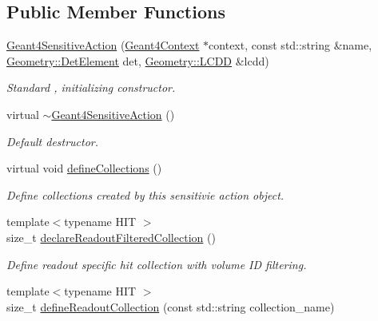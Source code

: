 \subsection*{Public Member Functions}
\begin{DoxyCompactItemize}
\item 
\hyperlink{class_d_d4hep_1_1_simulation_1_1_geant4_sensitive_action_ae1ede070242c666b523a1bb28a19a8f5}{Geant4SensitiveAction} (\hyperlink{class_d_d4hep_1_1_simulation_1_1_geant4_context}{Geant4Context} $\ast$context, const std::string \&name, \hyperlink{class_d_d4hep_1_1_geometry_1_1_det_element}{Geometry::DetElement} det, \hyperlink{class_d_d4hep_1_1_geometry_1_1_l_c_d_d}{Geometry::LCDD} \&lcdd)
\begin{DoxyCompactList}\small\item\em Standard , initializing constructor. \item\end{DoxyCompactList}\item 
virtual \hyperlink{class_d_d4hep_1_1_simulation_1_1_geant4_sensitive_action_a2f233b92d70c7303055662c753063c7f}{$\sim$Geant4SensitiveAction} ()
\begin{DoxyCompactList}\small\item\em Default destructor. \item\end{DoxyCompactList}\item 
virtual void \hyperlink{class_d_d4hep_1_1_simulation_1_1_geant4_sensitive_action_a103768b61e0f22768de9a91ce588a88c}{defineCollections} ()
\begin{DoxyCompactList}\small\item\em Define collections created by this sensitivie action object. \item\end{DoxyCompactList}\item 
{\footnotesize template$<$typename HIT $>$ }\\size\_\-t \hyperlink{class_d_d4hep_1_1_simulation_1_1_geant4_sensitive_action_a0a2a07e65f4808da39312569b32145ac}{declareReadoutFilteredCollection} ()
\begin{DoxyCompactList}\small\item\em Define readout specific hit collection with volume ID filtering. \item\end{DoxyCompactList}\item 
{\footnotesize template$<$typename HIT $>$ }\\size\_\-t \hyperlink{class_d_d4hep_1_1_simulation_1_1_geant4_sensitive_action_a06c06999bf63699e91462e156e0212e1}{defineReadoutCollection} (const std::string collection\_\-name)

\end{DoxyCompactItemize}
